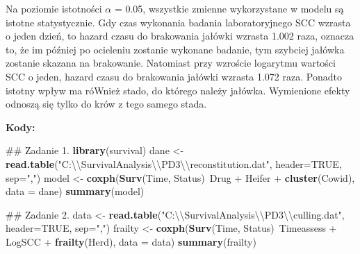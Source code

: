 \documentclass[]{article}
\newenvironment{Shaded}{}{}
\newcommand{\KeywordTok}[1]{\textcolor[rgb]{0.00,0.44,0.13}{\textbf{{#1}}}}
\newcommand{\DataTypeTok}[1]{\textcolor[rgb]{0.56,0.13,0.00}{{#1}}}
\newcommand{\CharTok}[1]{\textcolor[rgb]{0.25,0.44,0.63}{{#1}}}
\newcommand{\StringTok}[1]{\textcolor[rgb]{0.25,0.44,0.63}{{#1}}}
\newcommand{\OtherTok}[1]{\textcolor[rgb]{0.00,0.44,0.13}{{#1}}}
\newcommand{\NormalTok}[1]{{#1}}
\begin{document}
Na poziomie istotności $\alpha$ = 0.05, wszystkie zmienne wykorzystane w
modelu są istotne statystycznie. Gdy czas wykonania badania
laboratoryjnego SCC wzrasta o jeden dzień, to hazard czasu do brakowania
jałówki wzrasta 1.002 raza, oznacza to, że im później po ocieleniu
zostanie wykonane badanie, tym szybciej jałówka zostanie skazana na
brakowanie. Natomiast przy wzroście logarytmu wartości SCC o jeden,
hazard czasu do brakowania jałówki wzrasta 1.072 raza. Ponadto istotny
wpływ ma róWnież stado, do którego należy jałówka. Wymienione efekty
odnoszą się tylko do krów z tego samego stada.

\newpage
\textbf{Kody:}

\begin{Shaded}
\begin{Highlighting}[]
\NormalTok{## Zadanie 1.}
\KeywordTok{library}\NormalTok{(survival)}
\NormalTok{dane <-}\StringTok{ }\KeywordTok{read.table}\NormalTok{(}\StringTok{"C:}\CharTok{\textbackslash{}\textbackslash{}}\StringTok{SurvivalAnalysis}\CharTok{\textbackslash{}\textbackslash{}}\StringTok{PD3}\CharTok{\textbackslash{}\textbackslash{}}\StringTok{reconstitution.dat"}\NormalTok{, }\DataTypeTok{header=}\OtherTok{TRUE}\NormalTok{, }\DataTypeTok{sep=}\StringTok{","}\NormalTok{)}
\NormalTok{model <-}\StringTok{ }\KeywordTok{coxph}\NormalTok{(}\KeywordTok{Surv}\NormalTok{(Time, Status)~Drug +}\StringTok{ }\NormalTok{Heifer +}\StringTok{ }\KeywordTok{cluster}\NormalTok{(Cowid), }\DataTypeTok{data =} \NormalTok{dane) }
\KeywordTok{summary}\NormalTok{(model)}

\NormalTok{## Zadanie 2.}
\NormalTok{data <-}\StringTok{ }\KeywordTok{read.table}\NormalTok{(}\StringTok{"C:}\CharTok{\textbackslash{}\textbackslash{}}\StringTok{SurvivalAnalysis}\CharTok{\textbackslash{}\textbackslash{}}\StringTok{PD3}\CharTok{\textbackslash{}\textbackslash{}}\StringTok{culling.dat"}\NormalTok{, }\DataTypeTok{header=}\OtherTok{TRUE}\NormalTok{, }\DataTypeTok{sep=}\StringTok{","}\NormalTok{)}
\NormalTok{frailty <-}\StringTok{ }\KeywordTok{coxph}\NormalTok{(}\KeywordTok{Surv}\NormalTok{(Time, Status)~Timeassess +}\StringTok{ }\NormalTok{LogSCC +}\StringTok{ }\KeywordTok{frailty}\NormalTok{(Herd), }\DataTypeTok{data =} \NormalTok{data)}
\KeywordTok{summary}\NormalTok{(frailty)}
\end{Highlighting}
\end{Shaded}
\end{document}
